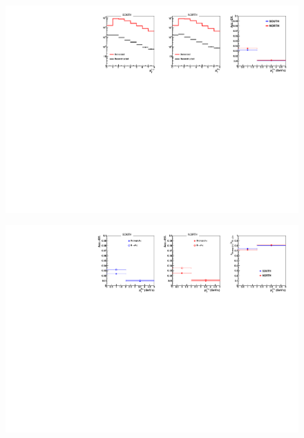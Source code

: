 \documentclass[12pt]{article}
\begin{document}
\begin{figure}[!htb]
	\includegraphics[width=1.0\textwidth]{Figures/Run12pp510_BJpsi_acc_eff}
	\caption{}
	\label{fig:BJpsi_acceff}
\end{figure}

\begin{figure}[!htb]
	\includegraphics[width=1.0\textwidth]{Figures/Run12pp510_acc_eff_comparison}
	\caption{}
	\label{fig:acceff_comparison}
\end{figure}
\end{document}
